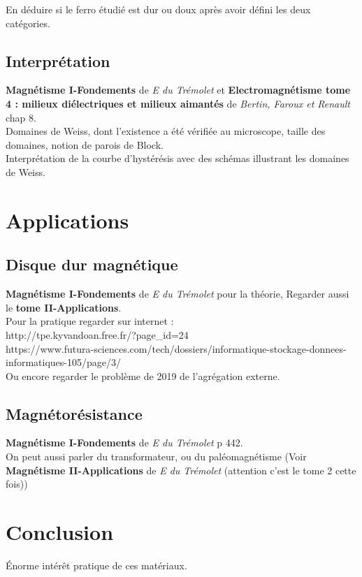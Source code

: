 \documentclass[12pt,prb,aps,epsf]{article}
\begin{document}
En déduire si le ferro étudié est dur ou doux après avoir défini les deux catégories.

\subsection{Interprétation}
\textbf{Magnétisme I-Fondements} de \textit{E du Trémolet} et \textbf{Electromagnétisme tome 4 : milieux diélectriques et milieux aimantés} de \textit{Bertin, Faroux et Renault} chap 8.\\

Domaines de Weiss, dont l'existence a été vérifiée au microscope, taille des domaines, notion de parois de Block.\\
Interprétation de la courbe d'hystérésis avec des schémas illustrant les domaines de Weiss.

\section{Applications}
\subsection{Disque dur magnétique}
\textbf{Magnétisme I-Fondements} de \textit{E du Trémolet} pour la théorie,
Regarder aussi le \textbf{tome II-Applications}.\\
Pour la pratique regarder sur internet :\\
http://tpe.kyvandoan.free.fr/?page\_id=24\\
https://www.futura-sciences.com/tech/dossiers/informatique-stockage-donnees-informatiques-105/page/3/\\

Ou encore regarder le problème de 2019 de l'agrégation externe.

\subsection{Magnétorésistance}
\textbf{Magnétisme I-Fondements} de \textit{E du Trémolet} p 442.\\

On peut aussi parler du transformateur, ou du paléomagnétisme (Voir \textbf{Magnétisme II-Applications} de \textit{E du Trémolet} (attention c'est le tome 2 cette fois))

\section{Conclusion}
Énorme intérêt pratique de ces matériaux.
\end{document}
